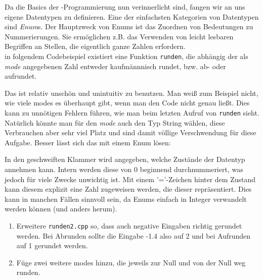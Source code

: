 
Da die Basics der \Cpp-Programmierung nun verinnerlicht sind, fangen wir an uns eigene Datentypen zu definieren.
Eine der einfachsten Kategorien von Datentypen sind \emph{Enum}s. Der Hauptzweck von Enums ist das Zuordnen von Bedeutungen zu Nummerierungen.
Sie ermöglichen z.B. das Verwenden von leicht lesbaren Begriffen an Stellen, die eigentlich ganze Zahlen erfordern. \\
in folgendem Codebeispiel existiert eine Funktion \texttt{runden}, die abhängig der als \emph{mode} angegebenen Zahl entweder kaufmännnisch rundet, bzw. ab- oder aufrundet.


Das ist relativ unschön und unintuitiv zu benutzen. Man weiß zum Beispiel nicht, wie viele modes es überhaupt gibt, wenn man den Code nicht genau ließt. Dies kann zu unnötigen Fehlern führen, wie man beim letzten Aufruf von \texttt{runden} sieht. Natürlich könnte man für den \emph{mode} auch den Typ String wählen, diese Verbrauchen aber sehr viel Platz und sind damit völlige Verschwendung für diese Aufgabe. Besser lässt sich das mit einem Enum lösen:


In den geschweiften Klammer wird angegeben, welche Zustände der Datentyp annehmen kann.
Intern werden diese von 0 beginnend durchnummeriert, was jedoch für viele Zwecke unwichtig ist.
Mit einem '='-Zeichen hinter dem Zustand kann diesem explizit eine Zahl zugeweisen werden, die dieser repräsentiert.
Dies kann in manchen Fällen sinnvoll sein, da Enums einfach in Integer verwandelt werden können (und anders herum).

\begin{praxis}
    \begin{enumerate}
        \item Erweitere \texttt{runden2.cpp} so, dass auch negative Eingaben richtig gerundet werden. Bei Abrunden sollte die Eingabe -1.4 also auf 2 und bei Aufrunden auf 1 gerundet werden.
        \item Füge zwei weitere modes hinzu, die jeweils zur Null und von der Null weg runden.
    \end{enumerate}
\end{praxis}